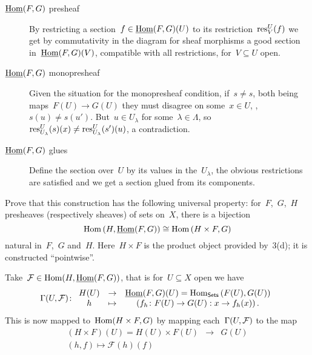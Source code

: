 \documentclass[a4paper,11pt,oneside,openany,article]{memoir}
\begin{document}
\begin{enumerate}
    \begin{solution}
      \begin{description}
        \item[$\underline{\operatorname{Hom}}(F,G)$ presheaf] By restricting a section~$f\in\underline{\operatorname{Hom}}(F,G)(U)$ to its restriction~$\mathrm{res}_V^U(f)$ we get by commutativity in the diagram for sheaf morphisms a good section in~$\underline{\operatorname{Hom}}(F,G)(V)$, compatible with all restrictions, for~$V\subseteq U$ open.
        \item[$\underline{\operatorname{Hom}}(F,G)$ monopresheaf] Given the situation for the monopresheaf condition, if~$s\neq s$, both being maps~$F(U)\to G(U)$ they must disagree on some~$x\in U$, \ie, $s(u)\neq s(u')$. But~$u\in U_\lambda$ for some~$\lambda\in\Lambda$, so~$\mathrm{res}_{U_\lambda}^U(s)(x)\neq\mathrm{res}_{U_\lambda}^U(s')(u)$, a contradiction.
        \item[$\underline{\operatorname{Hom}}(F,G)$ glues] Define the section over~$U$ by its values in the~$U_\lambda$, the obvious restrictions are satisfied and we get a section glued from its components.
      \end{description}
    \end{solution}

    Prove that this construction has the following universal property: for~$F$,~$G$,~$H$ presheaves (respectively sheaves) of sets on~$X$, there is a bijection
    \begin{equation}
      \operatorname{Hom}\left( H,\underline{\operatorname{Hom}}(F,G) \right)\cong\operatorname{Hom}\left( H\times F,G \right)
      \label{equation:natural-bijection}
    \end{equation}
    natural in~$F$,~$G$ and~$H$. Here~$H\times F$ is the product object provided by~3(d); it is constructed ``pointwise''.

    \begin{solution}
      Take~$\mathcal{F}\in\operatorname{Hom}(H,\underline{\operatorname{Hom}}(F,G))$, that is for~$U\subseteq X$ open we have
      \begin{equation}
        \mathrm{\Gamma}(U,\mathcal{F})\colon
        \begin{array}{ccc}
          H(U)&\to &\underline{\operatorname{Hom}}(F,G)(U)=\operatorname{Hom}_{\mathsf{Sets}}\left( F(U),G(U) \right) \\
          h&\mapsto & \left( f_h\colon F(U)\to G(U):x\to f_h(x) \right).
        \end{array}
      \end{equation}
      This is now mapped to~$\operatorname{Hom}(H\times F,G)$ by mapping each~$\mathrm{\Gamma}(U,\mathcal{F})$ to the map
      \begin{equation}
        \begin{array}{ccc}
          \left( H\times F \right)(U)=H(U)\times F(U)&\to&G(U) \\
          (h,f)\mapsto\mathcal{F}(h)(f)
        \end{array}
      \end{equation}


\end{solution}
\end{enumerate}
\end{document}
